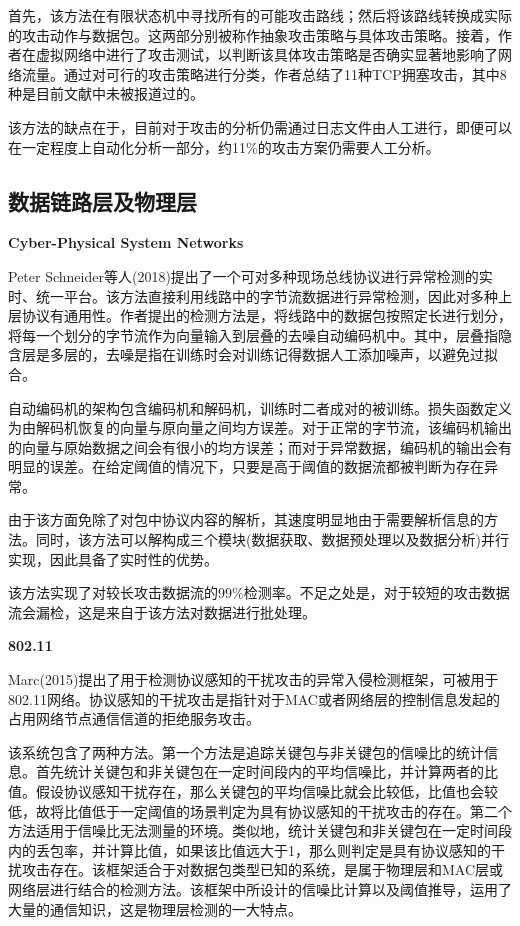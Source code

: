 \documentclass[12pt]{article} %
\begin{document}
首先，该方法在有限状态机中寻找所有的可能攻击路线；然后将该路线转换成实际的攻击动作与数据包。这两部分别被称作抽象攻击策略与具体攻击策略。接着，作者在虚拟网络中进行了攻击测试，以判断该具体攻击策略是否确实显著地影响了网络流量。通过对可行的攻击策略进行分类，作者总结了11种TCP拥塞攻击，其中8种是目前文献中未被报道过的。

该方法的缺点在于，目前对于攻击的分析仍需通过日志文件由人工进行，即便可以在一定程度上自动化分析一部分，约11\%的攻击方案仍需要人工分析。

\subsection{数据链路层及物理层}
\label{phy}

\textbf{Cyber-Physical System Networks}

Peter Schneider等人(2018)提出了一个可对多种现场总线协议进行异常检测的实时、统一平台。该方法直接利用线路中的字节流数据进行异常检测，因此对多种上层协议有通用性。作者提出的检测方法是，将线路中的数据包按照定长进行划分，将每一个划分的字节流作为向量输入到层叠的去噪自动编码机中。其中，层叠指隐含层是多层的，去噪是指在训练时会对训练记得数据人工添加噪声，以避免过拟合。

自动编码机的架构包含编码机和解码机，训练时二者成对的被训练。损失函数定义为由解码机恢复的向量与原向量之间均方误差。对于正常的字节流，该编码机输出的向量与原始数据之间会有很小的均方误差；而对于异常数据，编码机的输出会有明显的误差。在给定阈值的情况下，只要是高于阈值的数据流都被判断为存在异常。

由于该方面免除了对包中协议内容的解析，其速度明显地由于需要解析信息的方法。同时，该方法可以解构成三个模块(数据获取、数据预处理以及数据分析)并行实现，因此具备了实时性的优势。

该方法实现了对较长攻击数据流的99\%检测率。不足之处是，对于较短的攻击数据流会漏检，这是来自于该方法对数据进行批处理。

\textbf{802.11}

Marc(2015)提出了用于检测协议感知的干扰攻击的异常入侵检测框架，可被用于802.11网络。协议感知的干扰攻击是指针对于MAC或者网络层的控制信息发起的占用网络节点通信信道的拒绝服务攻击。

该系统包含了两种方法。第一个方法是追踪关键包与非关键包的信噪比的统计信息。首先统计关键包和非关键包在一定时间段内的平均信噪比，并计算两者的比值。假设协议感知干扰存在，那么关键包的平均信噪比就会比较低，比值也会较低，故将比值低于一定阈值的场景判定为具有协议感知的干扰攻击的存在。第二个方法适用于信噪比无法测量的环境。类似地，统计关键包和非关键包在一定时间段内的丢包率，并计算比值，如果该比值远大于1，那么则判定是具有协议感知的干扰攻击存在。该框架适合于对数据包类型已知的系统，是属于物理层和MAC层或网络层进行结合的检测方法。该框架中所设计的信噪比计算以及阈值推导，运用了大量的通信知识，这是物理层检测的一大特点。
\end{document}

